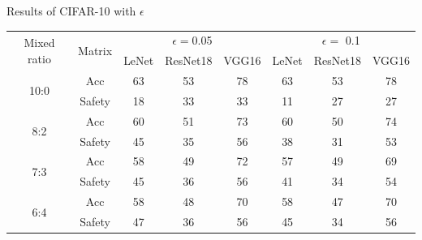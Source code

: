 \documentclass[journal,article,submit,moreauthors,pdftex]{Definitions/mdpi}
\begin{document}
\begin{specialtable}[H]
    \centering
    \caption{Results of CIFAR-10 with \begin{math}\epsilon\end{math}}
    \label{cifar10-result}
    {\small
    \begin{tabular}{|c|c|c|c|c|c|c|c|}
    \hline
    \multirow{2}{*}{Mixed ratio} & \multirow{2}{*}{Matrix} & \multicolumn{3}{c|}{\begin{math}\epsilon=\end{math}0.05}            & \multicolumn{3}{c|}{\begin{math}\epsilon=\end{math} 0.1}         \\ \cline{3-8} 
                                 &                           & LeNet               & ResNet18              & VGG16              & LeNet              & ResNet18              & VGG16              \\ \hline
    \multirow{2}{*}{10:0}        & Acc                       & 63                  & 53                    & 78                 & 63                 & 53                    & 78                 \\ \cline{2-8} 
                                 & Safety                    & 18                  & 33                    & 33                 & 11                 & 27                    & 27                 \\ \hline
    \multirow{2}{*}{8:2}         & Acc                       & 60                  & 51                    & 73                 & 60                 & 50                    & 74                 \\ \cline{2-8} 
                                 & Safety                    & 45                  & 35                    & 56                 & 38                 & 31                    & 53                 \\ \hline
    \multirow{2}{*}{7:3}         & Acc                       & 58                  & 49                    & 72                 & 57                 & 49                    & 69                 \\ \cline{2-8} 
                                 & Safety                    & 45                  & 36                    & 56                 & 41                 & 34                    & 54                 \\ \hline
    \multirow{2}{*}{6:4}         & Acc                       & 58                  & 48                    & 70                 & 58                 & 47                    & 70                 \\ \cline{2-8} 
                                 & Safety                    & 47                  & 36                    & 56                 & 45                 & 34                    & 56                 \\ \hline
    \end{tabular}
    }
\end{specialtable}
\end{document}
